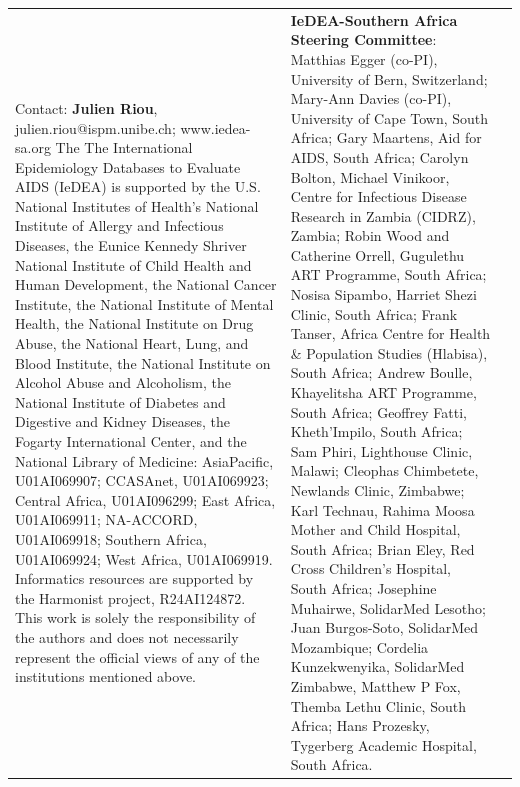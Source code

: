 \documentclass[paperwidth=137.2cm,paperheight=91.4cm]{baposter}
\begin{document}
\begin{poster}
{\begin{tabular}{p{.4\linewidth}p{.4\linewidth}|p{.2\linewidth}}
		\tiny{Contact:\textbf{ Julien Riou}, julien.riou@ispm.unibe.ch;  www.iedea-sa.org \hspace{3\linewidth} 
			The The International Epidemiology Databases to Evaluate AIDS (IeDEA) is supported by the U.S. National Institutes of Health’s National Institute of Allergy and Infectious Diseases, the Eunice Kennedy Shriver National Institute of Child Health and Human Development, the National Cancer Institute, the National Institute of Mental Health, the National Institute on Drug Abuse, the National Heart, Lung, and Blood Institute, the National Institute on Alcohol Abuse and Alcoholism, the National Institute of Diabetes and Digestive and Kidney Diseases, the Fogarty International Center, and the National Library of Medicine: AsiaPacific, U01AI069907; CCASAnet, U01AI069923; Central Africa, U01AI096299; East Africa, U01AI069911; NA-ACCORD, U01AI069918; Southern Africa, U01AI069924; West Africa, U01AI069919. Informatics resources are supported by the Harmonist project, R24AI124872. This work is solely the responsibility of the authors and does not necessarily represent the official views of any of the institutions mentioned above.}
		& \tiny{ \textbf{IeDEA-Southern Africa Steering Committee}: Matthias Egger (co-PI), University of Bern, Switzerland; Mary-Ann Davies (co-PI), University of Cape Town, South Africa; Gary Maartens, Aid for AIDS, South Africa; Carolyn Bolton, Michael Vinikoor, Centre for Infectious Disease Research in Zambia (CIDRZ), Zambia; Robin Wood and Catherine Orrell, Gugulethu ART Programme, South Africa; Nosisa Sipambo, Harriet Shezi Clinic, South Africa; Frank Tanser, Africa Centre for Health \& Population Studies (Hlabisa), South Africa; Andrew Boulle, Khayelitsha ART Programme, South Africa; Geoffrey Fatti, Kheth’Impilo, South Africa; Sam Phiri, Lighthouse Clinic, Malawi; Cleophas Chimbetete, Newlands Clinic, Zimbabwe; Karl Technau, Rahima Moosa Mother and Child Hospital, South Africa; Brian Eley, Red Cross Children's Hospital, South Africa; Josephine Muhairwe, SolidarMed Lesotho; Juan Burgos-Soto, SolidarMed Mozambique; Cordelia Kunzekwenyika, SolidarMed Zimbabwe, Matthew P Fox, Themba Lethu Clinic, South Africa; Hans Prozesky, Tygerberg Academic Hospital, South Africa.}
		

\end{tabular}}
\end{poster}
\end{document}
